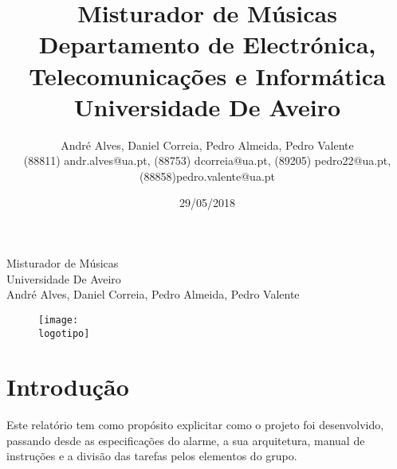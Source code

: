 \documentclass{report}
\begin{document}
%
\def\titulo{Misturador de Músicas}
\def\data{29/05/2018}
\def\autores{André Alves, Daniel Correia, Pedro Almeida, Pedro Valente}
\def\autorescontactos{(88811) andr.alves@ua.pt, (88753) dcorreia@ua.pt, (89205) pedro22@ua.pt, (88858)pedro.valente@ua.pt}
\def\departamento{Departamento de Electrónica, Telecomunicações e Informática}
\def\empresa{Universidade De Aveiro}
\def\logotipo{img/ua.pdf}
%

%
\begin{titlepage}

\begin{center}
%
\vspace*{50mm}
%
{\Huge \titulo}\\ 
%
\vspace{10mm}
%
{\Large \empresa}\\
%
\vspace{10mm}
%
{\LARGE \autores}\\ 
%
\vspace{30mm}
%
\begin{figure}[h]
\center
\texttt{[image: \\logotipo]}
\end{figure}
%
\vspace{30mm}
\end{center}
%

\end{titlepage}

\title{%
{\Huge\textbf{\titulo}}\\
{\Large \departamento\\ \empresa}
}
%
\author{%
    \autores \\
    \autorescontactos
}
%
\date{\data}
%
\maketitle



\tableofcontents
\listoffigures    %



\chapter{Introdução}
\label{chap.introducao}
Este relatório tem como propósito explicitar como o projeto foi desenvolvido, passando desde as especificações do alarme, a sua arquitetura, manual de instruções e a divisão das tarefas pelos elementos do grupo.
\end{document}
